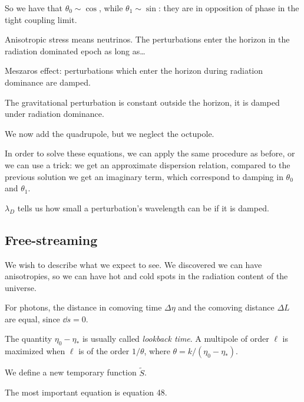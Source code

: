 \documentclass[main.tex]{subfiles}
\begin{document}
So we have that \(\theta_0 \sim \cos\), while \(\theta_1 \sim \sin\): they are in opposition of phase in the tight coupling limit. 

Anisotropic stress means neutrinos.
The perturbations enter the horizon in the radiation dominated epoch as long as\dots

Meszaros effect: perturbations which enter the horizon during radiation dominance are damped. 

The gravitational perturbation is constant outside the horizon, it is damped under radiation dominance. 

We now add the quadrupole, but we neglect the octupole. 

In order to solve these equations, we can apply the same procedure as before, or we can use a trick: we get an approximate dispersion relation, compared to the previous solution we get an imaginary term, which correspond to damping in \(\theta_0 \) and \(\theta_1 \). 

\(\lambda_{D}\) tells us how small a perturbation's wavelength can be if it is damped. 

\subsection{Free-streaming}

We wish to describe what we expect to see.
We discovered we can have anisotropies, so we can have hot and cold spots in the radiation content of the universe. 

For photons, the distance in comoving time \(\Delta \eta \) and the comoving distance \(\Delta L\) are equal, since \(\dd{s} = 0\). 

The quantity \(\eta_0 - \eta_{*} \) is usually called \emph{lookback time}. 
A multipole of order \(\ell\) is maximized when \(\ell\)  is of the order \(1/ \theta \), where \(\theta = k / (\eta_0 - \eta_*)\). 

We define a new temporary function \(\widetilde{S}\).

The most important equation is equation 48. 
\end{document}
